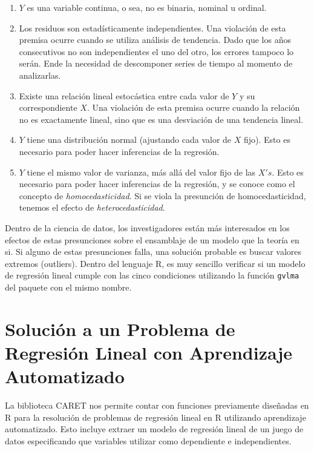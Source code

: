 \documentclass[letterpaper, spanish, 11pt]{report}
\begin{document}
\begin{enumerate}
	\item $Y$ es una variable continua, o sea, no es binaria, nominal u ordinal.
	\item Los residuos son estadísticamente independientes. Una violación de esta premisa ocurre cuando se utiliza análisis de tendencia. Dado que los años consecutivos no son independientes el uno del otro, los errores tampoco lo serán. Ende la necesidad de descomponer series de tiempo al momento de analizarlas.
	\item Existe una relación lineal estocástica entre cada valor de $Y$ y su correspondiente $X$. Una violación de esta premisa ocurre cuando la relación no es exactamente lineal, sino que es una desviación de una tendencia lineal.
	\item $Y$ tiene una distribución normal (ajustando cada valor de $X$ fijo). Esto es necesario para poder hacer inferencias de la regresión.
	\item $Y$ tiene el mismo valor de varianza, más allá del valor fijo de las $X's$. Esto es necesario para poder hacer inferencias de la regresión, y se conoce como el concepto de \emph{homocedasticidad}. Si se viola la presunción de homocedasticidad, tenemos el efecto de \emph{heterocedasticidad}.
\end{enumerate}

Dentro de la ciencia de datos, los investigadores están más interesados en los efectos de estas presunciones sobre el ensamblaje de un modelo que la teoría en si. Si alguno de estas presunciones falla, una solución probable es buscar valores extremos (outliers). Dentro del lenguaje R, es muy sencillo verificar si un modelo de regresión lineal cumple con las cinco condiciones utilizando la función \texttt{gvlma} del paquete con el mismo nombre.

\section{Solución a un Problema de Regresión Lineal con Aprendizaje Automatizado}
La biblioteca CARET nos permite contar con funciones previamente diseñadas en R para la resolución de problemas de regresión lineal en R utilizando aprendizaje automatizado. Esto incluye extraer un modelo de regresión lineal de un juego de datos especificando que variables utilizar como dependiente e independientes.
\end{document}
